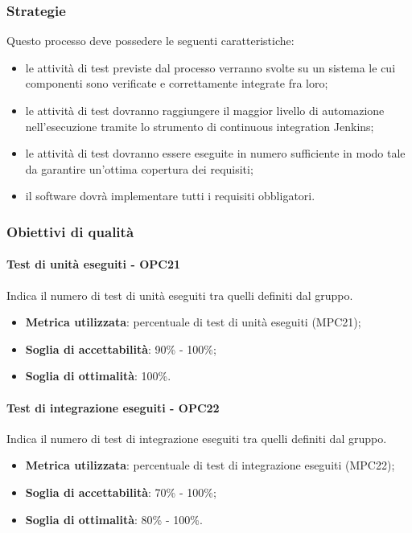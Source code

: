 \documentclass[PdQ.tex]{subfiles}
\begin{document}
		\subsubsection{Strategie}
			Questo processo deve possedere le seguenti caratteristiche:
			\begin{itemize}
				\item le attività di test previste dal processo verranno svolte su un sistema le cui componenti sono verificate e correttamente integrate fra loro;
				\item le attività di test dovranno raggiungere il maggior livello di automazione nell'esecuzione tramite lo strumento di continuous integration Jenkins;
				\item le attività di test dovranno essere eseguite in numero sufficiente in modo tale da garantire un'ottima copertura dei requisiti;
				\item il software dovrà implementare tutti i requisiti obbligatori. 
			\end{itemize}
		
		\subsubsection{Obiettivi di qualità}
			\paragraph{Test di unità eseguiti - OPC21}
				Indica il numero di test di unità eseguiti tra quelli definiti dal gruppo.
				\begin{itemize}
					\item \textbf{Metrica utilizzata}: percentuale di test di unità eseguiti (MPC21);
					\item \textbf{Soglia di accettabilità}: 90\% - 100\%;
					\item \textbf{Soglia di ottimalità}: 100\%.
				\end{itemize}
			
			\paragraph{Test di integrazione eseguiti - OPC22}
				Indica il numero di test di integrazione eseguiti tra quelli definiti dal gruppo.
				\begin{itemize}
					\item \textbf{Metrica utilizzata}: percentuale di test di integrazione eseguiti (MPC22);
					\item \textbf{Soglia di accettabilità}: 70\% - 100\%;
					\item \textbf{Soglia di ottimalità}: 80\% - 100\%.
				\end{itemize}
				
\end{document}
